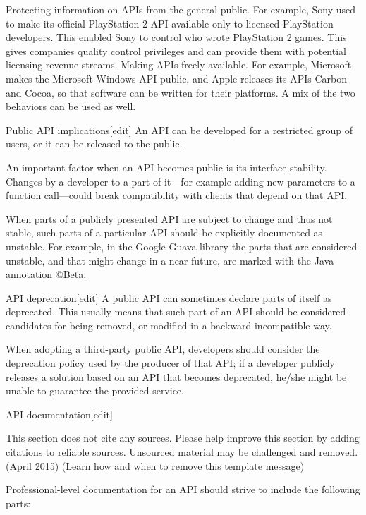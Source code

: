 Protecting information on APIs from the general public.
 For example, Sony used to make its official PlayStation 2 API available only to licensed PlayStation developers. 
 This enabled Sony to control who wrote PlayStation 2 games. 
 This gives companies quality control privileges and can provide them with potential licensing revenue streams.
Making APIs freely available.
 For example, Microsoft makes the Microsoft Windows API public, and Apple releases its APIs Carbon and Cocoa, so that software can be written for their platforms.
A mix of the two behaviors can be used as well.

Public API implications[edit]
An API can be developed for a restricted group of users, or it can be released to the public.

An important factor when an API becomes public is its interface stability. 
Changes by a developer to a part of it—for example adding new parameters to a function call—could break compatibility with clients that depend on that API.

When parts of a publicly presented API are subject to change and thus not stable, such parts of a particular API should be explicitly documented as unstable. 
For example, in the Google Guava library the parts that are considered unstable, and that might change in a near future, are marked with the Java annotation @Beta.

API deprecation[edit]
A public API can sometimes declare parts of itself as deprecated. 
This usually means that such part of an API should be considered candidates for being removed, or modified in a backward incompatible way.

When adopting a third-party public API, developers should consider the deprecation policy used by the producer of that API; 
if a developer publicly releases a solution based on an API that becomes deprecated, he/she might be unable to guarantee the provided service.

API documentation[edit]

This section does not cite any sources. Please help improve this section by adding citations to reliable sources.
 Unsourced material may be challenged and removed. (April 2015) (Learn how and when to remove this template message)

Professional-level documentation for an API should strive to include the following parts:

